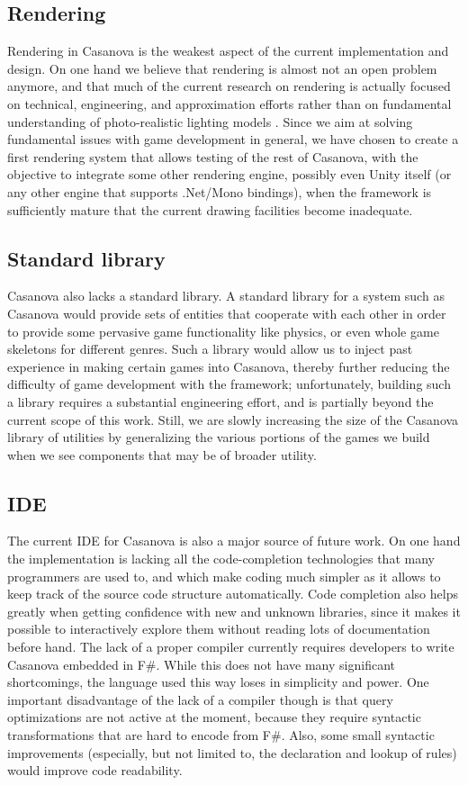 \subsection{Rendering}
Rendering in Casanova is the weakest aspect of the current implementation and design. On one hand we believe that rendering is almost not an open problem anymore, and that much of the current research on rendering is actually focused on technical, engineering, and approximation efforts \cite{GPU_GEMS_1, GPU_GEMS_2, GPU_GEMS_3} rather than on fundamental understanding of photo-realistic lighting models \cite{CHAPTER_9_RENDERING_EQUATION}. Since we aim at solving fundamental issues with game development in general, we have chosen to create a first rendering system that allows testing of the rest of Casanova, with the objective to integrate some other rendering engine, possibly even Unity itself (or any other engine that supports .Net/Mono bindings), when the framework is sufficiently mature that the current drawing facilities become inadequate.

\subsection{Standard library}
Casanova also lacks a standard library. A standard library for a system such as Casanova would provide sets of entities that cooperate with each other in order to provide some pervasive game functionality like physics, or even whole game skeletons for different genres. Such a library would allow us to inject past experience in making certain games into Casanova, thereby further reducing the difficulty of game development with the framework; unfortunately, building such a library requires a substantial engineering effort, and is partially beyond the current scope of this work. Still, we are slowly increasing the size of the Casanova library of utilities by generalizing the various portions of the games we build when we see components that may be of broader utility.

\subsection{IDE}
The current IDE for Casanova is also a major source of future work. On one hand the implementation is lacking all the code-completion technologies that many programmers are used to, and which make coding much simpler as it allows to keep track of the source code structure automatically. Code completion also helps greatly when getting confidence with new and unknown libraries, since it makes it possible to interactively explore them without reading lots of documentation before hand. 
The lack of a proper compiler currently requires developers to write Casanova embedded in F\#. While this does not have many significant shortcomings, the language used this way loses in simplicity and power. One important disadvantage of the lack of a compiler though is that query optimizations are not active at the moment, because they require syntactic transformations that are hard to encode from F\#. Also, some small syntactic improvements (especially, but not limited to, the declaration and lookup of rules) would improve code readability. 

